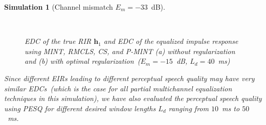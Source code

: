 \documentclass[10pt]{IEEEtran}
\newtheorem{simulation}{Simulation}
\begin{document}
\begin{simulation}[Channel mismatch $E_m=-33$~dB]
\begin{figure}[b]
\centering
\hbox{\hspace{-0.5cm}
}
\caption{EDC of the true RIR $\mathbf{h}_1$ and EDC of the equalized impulse response using MINT, RMCLS, CS, and P-MINT (a) without regularization and (b) with optimal regularization~($E_m = -15$~dB, $L_d = 40$~ms)}
\end{figure}
Since different EIRs leading to different perceptual speech quality may have very similar EDCs~(which is the case for all partial multichannel equalization techniques in this simulation), we have also evaluated the perceptual speech quality using PESQ for different desired window lengths $L_d$ ranging from $10$~ms to $50$~ms.

\end{simulation}
\end{document}
